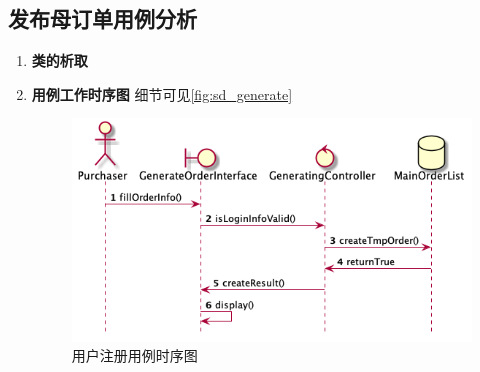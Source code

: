 	\subsection{发布母订单用例分析} %
	\label{sub:发布母订单用例分析}
	\begin{enumerate}
		\item \textbf{类的析取}

		\item \textbf{用例工作时序图}
		细节可见\autoref{fig:sd_generate}

		\begin{figure}[htp]
		    \centering
		    \includegraphics[width=12cm]{figure/sequenceDiagram/sd_generateOrder.png}
		    \caption{用户注册用例时序图}
		    \label{fig:sd_generate}
		\end{figure}

	\end{enumerate}

